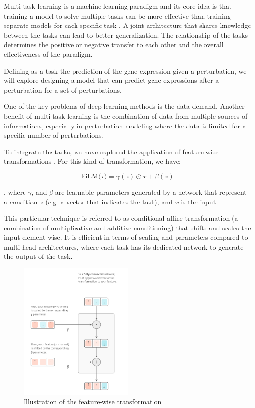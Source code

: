 \documentclass[12pt, a4paper]{article}
\begin{document}
Multi-task learning is a machine learning paradigm and its core idea is that training a model to solve multiple tasks can be more effective than training separate models for each specific task \cite{zhangSurveyMultiTaskLearning2021}. A joint architecture that shares knowledge between the tasks can lead to better generalization.
The relationship of the tasks determines the positive or negative transfer to each other and the overall effectiveness of the paradigm.

Defining as a task the prediction of the gene expression given a perturbation, we will explore designing a model that can predict gene expressions after a perturbation for a set of perturbations.

One of the key problems of deep learning methods is the data demand. Another benefit of multi-task learning is the combination of data from multiple sources of informations, especially in perturbation modeling where the data is limited for a specific number of perturbations. 

To integrate the tasks, we have explored the application of feature-wise transformations \cite{dumoulin2018feature-wise}. For this kind of transformation, we have:

\[ \text{FiLM(x)} = \gamma (z) \odot x + \beta (z) \]

, where $\gamma$, and $\beta$ are learnable parameters generated by a network that represent a condition $z$ (e.g. a vector that indicates the task), and $x$ is the input.

This particular technique is referred to as conditional affine transformation (a combination of multiplicative and additive conditioning) that shifts and scales the input element-wise. It is efficient in terms of scaling and parameters compared to multi-head architectures, where each task has its dedicated network to generate the output of the task.


\begin{figure}
    \centering
    \includegraphics[width=0.5\textwidth]{film_layers.png}
    \caption{Illustration of the feature-wise transformation \cite{dumoulin2018feature-wise}}
    \label{fig:film}
\end{figure}
\end{document}
